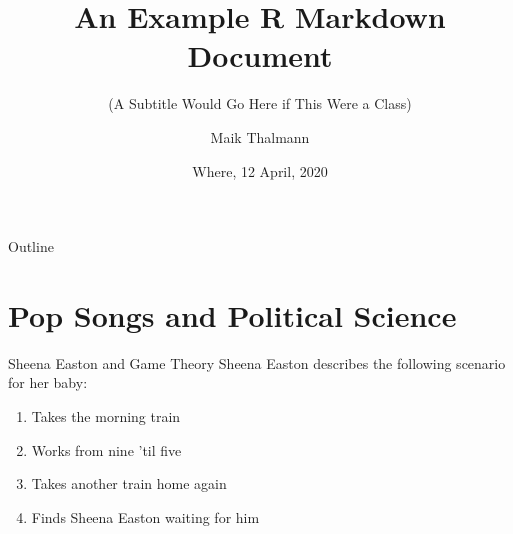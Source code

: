 \documentclass[10pt,ignorenonframetext,,aspectratio=149]{beamer}
\title{An Example R Markdown Document}
\subtitle{(A Subtitle Would Go Here if This Were a Class)}
\author{Maik Thalmann}
\date{Where, 12 April, 2020}
\institute{Georg-August-University Göttingen}
\providecommand{\tightlist}{%
  \setlength{\itemsep}{0pt}\setlength{\parskip}{0pt}}
\begin{document}
\frame{\titlepage}

\begin{frame}{Outline}
  \tableofcontents
\end{frame}

\hypertarget{pop-songs-and-political-science}{%
\section{Pop Songs and Political
Science}\label{pop-songs-and-political-science}}

\begin{frame}{Sheena Easton and Game Theory}
\protect\hypertarget{sheena-easton-and-game-theory}{}
Sheena Easton describes the following scenario for her baby:

\begin{enumerate}
\tightlist
\item
  Takes the morning train
\item
  Works from nine 'til five
\item
  Takes another train home again
\item
  Finds Sheena Easton waiting for him
\end{enumerate}
\end{frame}
\end{document}
